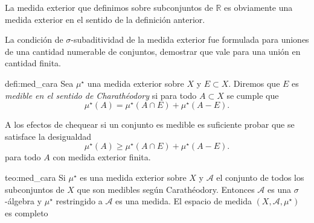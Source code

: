 \begin{ejemplo}{} La medida exterior que definimos sobre subconjuntos de $\mathbb{R}$ es obviamente una medida exterior en el sentido de la definición anterior. 
\end{ejemplo}


\begin{ejercicio}{} La condición de $\sigma$-subaditividad de la medida exterior fue formulada para uniones de una cantidad numerable de conjuntos, demostrar que vale para una unión en cantidad finita.
\end{ejercicio}



\begin{definicion}{defi:med_cara}
 Sea $\mu^\star$ una medida exterior sobre $X$ y $E\subset X$. Diremos que $E$ es \emph{medible en el sentido de Charathéodory}  si para todo $A\subset X$ se cumple que
 \begin{equation}\label{eq:cond_cara}
  \mu^\star(A)=\mu^\star(A\cap E)+\mu^\star(A-E).
 \end{equation}

\end{definicion}

 \begin{observacion} A los efectos de chequear si un conjunto es medible es suficiente probar que se satisface la desigualdad 
   \begin{equation}\label{eq:cond_caraII}
  \mu^\star(A)\geq\mu^\star(A\cap E)+\mu^\star(A-E).
 \end{equation}
 para todo $A$ con medida exterior finita.
 \end{observacion}
 
 
 \begin{teorema}{teo:med_cara} Si $\mu^\star$ es una medida exterior sobre $X$ y $\mathscr{A}$ el conjunto de todos los subconjuntos de $X$ que son medibles según Carathéodory. Entonces  $\mathscr{A}$ es una $\sigma$-álgebra y $\mu^\star$ restringido a $\mathscr{A}$ es una medida. El espacio de medida $(X,\mathscr{A},\mu^\star)$ es completo
  
 \end{teorema}
 
